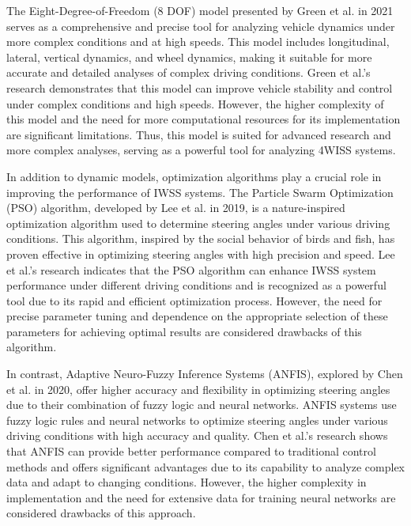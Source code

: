 \documentclass[a4paper,10pt]{article}
\begin{document}
        The Eight-Degree-of-Freedom (8 DOF) model presented by Green et al. in 2021 serves as a comprehensive and precise tool for analyzing vehicle dynamics under more complex conditions and at high speeds. This model includes longitudinal, lateral, vertical dynamics, and wheel dynamics, making it suitable for more accurate and detailed analyses of complex driving conditions. Green et al.'s research demonstrates that this model can improve vehicle stability and control under complex conditions and high speeds. However, the higher complexity of this model and the need for more computational resources for its implementation are significant limitations. Thus, this model is suited for advanced research and more complex analyses, serving as a powerful tool for analyzing 4WISS systems.
    
        In addition to dynamic models, optimization algorithms play a crucial role in improving the performance of IWSS systems. The Particle Swarm Optimization (PSO) algorithm, developed by Lee et al. in 2019, is a nature-inspired optimization algorithm used to determine steering angles under various driving conditions. This algorithm, inspired by the social behavior of birds and fish, has proven effective in optimizing steering angles with high precision and speed. Lee et al.'s research indicates that the PSO algorithm can enhance IWSS system performance under different driving conditions and is recognized as a powerful tool due to its rapid and efficient optimization process. However, the need for precise parameter tuning and dependence on the appropriate selection of these parameters for achieving optimal results are considered drawbacks of this algorithm.
    
        In contrast, Adaptive Neuro-Fuzzy Inference Systems (ANFIS), explored by Chen et al. in 2020, offer higher accuracy and flexibility in optimizing steering angles due to their combination of fuzzy logic and neural networks. ANFIS systems use fuzzy logic rules and neural networks to optimize steering angles under various driving conditions with high accuracy and quality. Chen et al.'s research shows that ANFIS can provide better performance compared to traditional control methods and offers significant advantages due to its capability to analyze complex data and adapt to changing conditions. However, the higher complexity in implementation and the need for extensive data for training neural networks are considered drawbacks of this approach.
    
\end{document}
